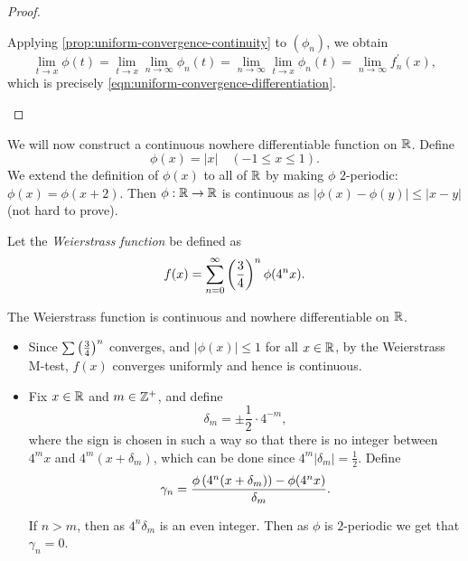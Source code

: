 \begin{proof}
\begin{enumerate}
Applying \ref{prop:uniform-convergence-continuity} to $(\phi_n)$, we obtain
\[\lim_{t\to x}\phi(t)
=\lim_{t\to x}\lim_{n\to\infty}\phi_n(t)
=\lim_{n\to\infty}\lim_{t\to x}\phi_n(t)
=\lim_{n\to\infty}f_n^\prime(x),\]
which is precisely \eqref{eqn:uniform-convergence-differentiation}. 
\end{enumerate}
\end{proof}

\begin{example}
We will now construct a continuous nowhere differentiable function on $\mathbb R$. 
Define
\[\phi(x)=|x|\quad(-1\le x\le 1).\]
We extend the definition of $\phi(x)$ to all of $\mathbb R$ by making $\phi$ $2$-periodic: $\phi(x)=\phi(x+2)$. Then $\phi:\mathbb R\to\mathbb R$ is continuous as $|\phi(x)-\phi(y)|\le|x-y|$ (not hard to prove).

Let the \emph{Weierstrass function} be defined as
\[f(x)=\sum_{n=0}^{\infty}\left(\frac{3}{4}\right)^n\phi(4^n x).\]
\begin{claim}
The Weierstrass function is continuous and nowhere differentiable on $\mathbb R$.
\end{claim}
\begin{itemize}
\item Since $\sum\left(\frac{3}{4}\right)^n$ converges, and $|\phi(x)|\le1$ for all $x\in\mathbb R$, by the Weierstrass M-test, $f(x)$ converges uniformly and hence is continuous.

\item Fix $x\in\mathbb R$ and $m\in\mathbb Z^+$, and define
\[\delta_m=\pm\frac{1}{2}\cdot 4^{-m},\]
where the sign is chosen in such a way so that there is no integer between $4^m x$ and $4^m(x+\delta_m)$, which can be done since $4^m|\delta_m|=\frac{1}{2}$. Define
\[\gamma_n=\frac{\phi\left(4^n(x+\delta_m)\right)-\phi(4^n x)}{\delta_m}.\]

If $n>m$, then as $4^n\delta_m$ is an even integer. Then as $\phi$ is $2$-periodic we get that $\gamma_n=0$. 


\end{itemize}
\end{example}
